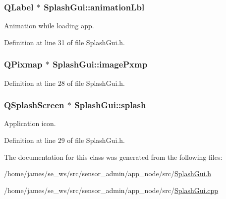 \hypertarget{class_splash_gui_aed3b35b60e42d5cd54c2db2f3ec805ab}{
\subsubsection[{animation\-Lbl}]{\setlength{\rightskip}{0pt plus 5cm}Q\-Label $\ast$ Splash\-Gui\-::animation\-Lbl\hspace{0.3cm}{\ttfamily [private]}}}\label{class_splash_gui_aed3b35b60e42d5cd54c2db2f3ec805ab}
Animation while loading app. 

Definition at line 31 of file Splash\-Gui.\-h.

\hypertarget{class_splash_gui_a157210e72a9a561b498a117e5af759f0}{
\subsubsection[{image\-Pxmp}]{\setlength{\rightskip}{0pt plus 5cm}Q\-Pixmap $\ast$ Splash\-Gui\-::image\-Pxmp\hspace{0.3cm}{\ttfamily [private]}}}\label{class_splash_gui_a157210e72a9a561b498a117e5af759f0}


Definition at line 28 of file Splash\-Gui.\-h.

\hypertarget{class_splash_gui_a268004470ba048e2791209565c619ee1}{
\subsubsection[{splash}]{\setlength{\rightskip}{0pt plus 5cm}Q\-Splash\-Screen $\ast$ Splash\-Gui\-::splash\hspace{0.3cm}{\ttfamily [private]}}}\label{class_splash_gui_a268004470ba048e2791209565c619ee1}
Application icon. 

Definition at line 29 of file Splash\-Gui.\-h.



The documentation for this class was generated from the following files\-:\begin{DoxyCompactItemize}
\item 
/home/james/se\-\_\-ws/src/sensor\-\_\-admin/app\-\_\-node/src/\hyperlink{app__node_2src_2_splash_gui_8h}{Splash\-Gui.\-h}\item 
/home/james/se\-\_\-ws/src/sensor\-\_\-admin/app\-\_\-node/src/\hyperlink{app__node_2src_2_splash_gui_8cpp}{Splash\-Gui.\-cpp}\end{DoxyCompactItemize}
